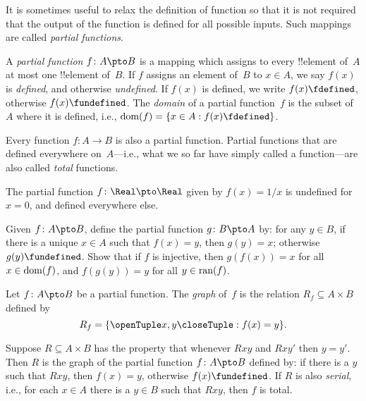 \documentclass[../../../include/open-logic-section]{subfiles}
\begin{document}


\begin{explain}
It is sometimes useful to relax the definition of function so that it
is not required that the output of the function is defined for all
possible inputs. Such mappings are called \emph{partial functions}.
\end{explain}

\begin{defn}
A \emph{partial function} $f \colon A \pto B$ is a mapping which
assigns to every !!{element} of~$A$ at most one !!{element} of~$B$.
If $f$ assigns an element of~$B$ to $x \in A$, we say $f(x)$ is
\emph{defined}, and otherwise \emph{undefined}. If $f(x)$ is defined,
we write $f(x) \fdefined$, otherwise $f(x) \fundefined$. The
\emph{domain} of a partial function~$f$ is the subset of~$A$ where it
is defined, i.e., $\dom{f} = \Setabs{x \in A}{f(x) \fdefined}$.
\end{defn}

\begin{ex}
Every function $f\colon A \to B$ is also a partial function. Partial
functions that are defined everywhere on~$A$---i.e., what we so far
have simply called a function---are also called \emph{total}
functions.
\end{ex}

\begin{ex}
The partial function $f \colon \Real \pto \Real$ given by $f(x) = 1/x$
is undefined for $x = 0$, and defined everywhere else.
\end{ex}

\begin{prob}
Given $f\colon A \pto B$, define the partial function $g\colon B \pto
A$ by: for any $y \in B$, if there is a unique $x \in A$ such that
$f(x) = y$, then $g(y) = x$; otherwise $g(y) \fundefined$.  Show that
if $f$ is injective, then $g(f(x)) = x$ for all $x \in \mathrm{dom}(f)$, and
$f(g(y)) = y$ for all $y \in \mathrm{ran}(f)$.
\end{prob}

\begin{defn}
Let $f\colon A \pto B$ be a partial function. The \emph{graph} of~$f$
is the relation $R_f \subseteq A \times B$ defined by
\[
R_f = \Setabs{\tuple{x,y}}{f(x) = y}.
\]
\end{defn}

\begin{prop}
Suppose $R \subseteq A \times B$ has the property that whenever $Rxy$
and $Rxy'$ then $y = y'$.  Then $R$ is the graph of the partial
function $f\colon A \pto B$ defined by: if there is a $y$ such that
$Rxy$, then $f(x) = y$, otherwise $f(x) \fundefined$.  If $R$ is also
\emph{serial}, i.e., for each $x \in A$ there is a $y \in B$ such that
$Rxy$, then $f$ is total.
\end{prop}
\end{document}
